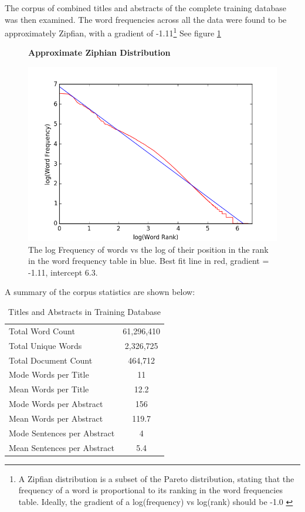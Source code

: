 The corpus of combined titles and abstracts of the complete training database was then examined. The word frequencies across all the data were found to be approximately Zipfian, with a gradient of -1.11\footnote{A Zipfian distribution is a subset of the Pareto distribution, stating that the frequency of a word is proportional to its ranking in the word frequencies table. Ideally, the gradient of a log(frequency) vs log(rank) should be -1.0 \cite{zipf}} See figure \ref{fig:ZIPF}
\begin{figure}[H]
    \centering
    \textbf{Approximate Ziphian Distribution}\par\medskip
    \includegraphics[scle=0.6]{Data_Acquisition/zipf.png}
    \caption{The log Frequency of words vs the log of their position in the rank in the word frequency table in blue. Best fit line in red, gradient = -1.11, intercept 6.3. }
     \label{fig:ZIPF}
\end{figure}
A summary of the corpus statistics are shown below:
\begin{table}[h!]
\label{tab:CORPUS STATS}
\caption{Titles and Abstracts in Training Database}
\begin{center}
\begin{tabular}{||l|c||}
\hline
Total Word Count & 61,296,410\\
Total Unique Words & 2,326,725\\
Total Document Count & 464,712\\
Mode Words per Title &  11\\
Mean Words per Title &  12.2\\
Mode Words per Abstract & 156\\
Mean Words per Abstract & 119.7\\
Mode Sentences per Abstract & 4\\
Mean Sentences per Abstract & 5.4\\
\hline
\end{tabular}
\end{center}
\end{table}

\label{sec:SCRAPEANALYSIS}
